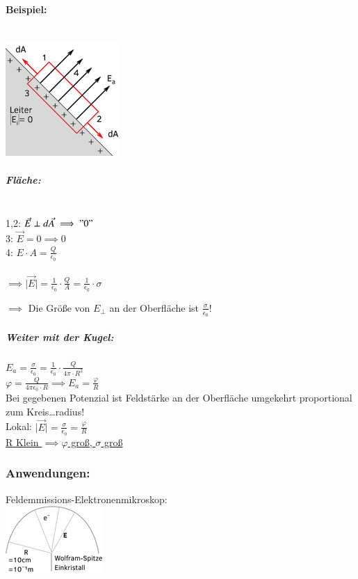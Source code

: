 \documentclass[11pt]{article}
\begin{document}
\paragraph{Beispiel:}
\hfill\\
\includegraphics{skizzen/14/14_8B1}
\\
\subparagraph{Fläche:}
\hfill\\
1,2: $ \vec{E}\perp d\vec{A} \implies "0" $\\
3: $ \vec{E}=0 \implies 0 $\\
4: $ E\cdot A= \frac{Q}{\epsilon_0} $\\
\hfill\\

$ \implies \vert\vec{E}\vert = \frac{1}{\epsilon_0}\cdot \frac{Q}{A} = \frac{1}{\epsilon_0}\cdot\sigma $

$\implies$ Die Größe von $E_\perp$ an der Oberfläche ist $\frac{\sigma}{\epsilon_0}$!\\

\subparagraph{Weiter mit der Kugel:} $ E_a= \frac{\sigma}{\epsilon_0}=\frac{1}{\epsilon_0}\cdot\frac{Q}{4\pi\cdot R^2} $\\

$ \varphi = \frac{Q}{4\pi\epsilon_0\cdot R} \implies E_a=\frac{\varphi}{R}$\\

Bei gegebenen Potenzial ist Feldstärke an der Oberfläche umgekehrt proportional zum Kreis…radius!\\

Lokal: $ \vert\vec{E}\vert = \frac{\sigma}{\epsilon_0}=\frac{\varphi}{R} $\\

\underline{R Klein $\implies \varphi$ groß, $\sigma$ groß}\\

\subsubsection{Anwendungen:} Feldemmissions-Elektronenmikroskop:
\hfill\\
\includegraphics{skizzen/14/14_8B2}\\
\end{document}
